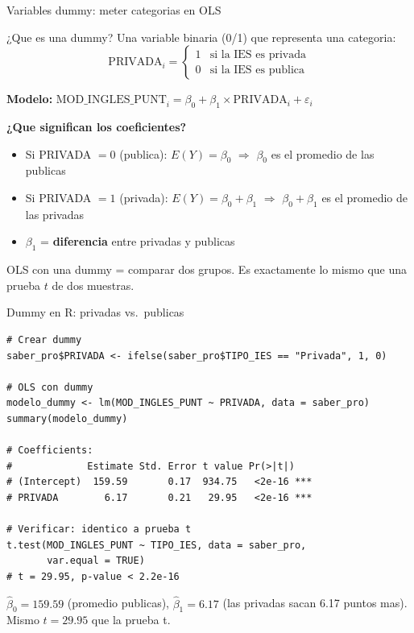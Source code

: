 \documentclass[aspectratio=169, 11pt]{beamer}
\begin{document}
\begin{frame}{Variables dummy: meter categorias en OLS}
\small
\begin{block}{¿Que es una dummy?}
Una variable binaria (0/1) que representa una categoria:
\[
\text{PRIVADA}_i = \begin{cases} 1 & \text{si la IES es privada} \\ 0 & \text{si la IES es publica} \end{cases}
\]
\end{block}

\vspace{0.2cm}
\textbf{Modelo:}
$\text{MOD\_INGLES\_PUNT}_i = \beta_0 + \beta_1 \times \text{PRIVADA}_i + \varepsilon_i$

\vspace{0.2cm}
\textbf{¿Que significan los coeficientes?}
\begin{itemize}
  \item Si PRIVADA $= 0$ (publica): $E(Y) = \beta_0$ $\Rightarrow$ $\beta_0$ es el promedio de las publicas
  \item Si PRIVADA $= 1$ (privada): $E(Y) = \beta_0 + \beta_1$ $\Rightarrow$ $\beta_0 + \beta_1$ es el promedio de las privadas
  \item $\beta_1$ = \textbf{diferencia} entre privadas y publicas
\end{itemize}

\vspace{0.1cm}
\begin{alertblock}{}
\small OLS con una dummy = comparar dos grupos. Es exactamente lo mismo que una prueba $t$ de dos muestras.
\end{alertblock}
\end{frame}

\begin{frame}[fragile]{Dummy en R: privadas vs.\ publicas}
\begin{lstlisting}[basicstyle=\ttfamily\scriptsize]
# Crear dummy
saber_pro$PRIVADA <- ifelse(saber_pro$TIPO_IES == "Privada", 1, 0)

# OLS con dummy
modelo_dummy <- lm(MOD_INGLES_PUNT ~ PRIVADA, data = saber_pro)
summary(modelo_dummy)

# Coefficients:
#             Estimate Std. Error t value Pr(>|t|)
# (Intercept)  159.59       0.17  934.75   <2e-16 ***
# PRIVADA        6.17       0.21   29.95   <2e-16 ***

# Verificar: identico a prueba t
t.test(MOD_INGLES_PUNT ~ TIPO_IES, data = saber_pro,
       var.equal = TRUE)
# t = 29.95, p-value < 2.2e-16
\end{lstlisting}

\vspace{0.1cm}
\small
$\hat{\beta}_0 = 159.59$ (promedio publicas), $\hat{\beta}_1 = 6.17$ (las privadas sacan 6.17 puntos mas). Mismo $t = 29.95$ que la prueba t.
\end{frame}
\end{document}
